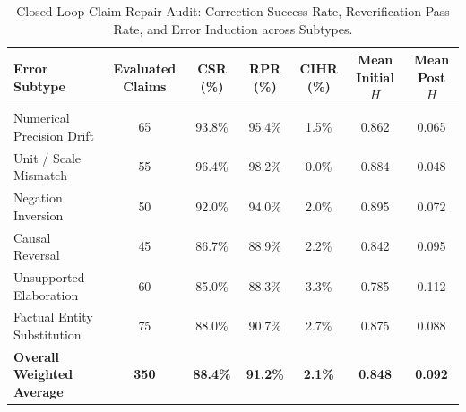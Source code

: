 \begin{table}[t]
\centering
\small
\caption{Closed-Loop Claim Repair Audit: Correction Success Rate, Reverification Pass Rate, and Error Induction across Subtypes.}
\label{tab:closed_loop_correction}
\begin{tabular}{lcccccc}
\toprule
\textbf{Error Subtype} & \textbf{Evaluated Claims} & \textbf{CSR (\%)} & \textbf{RPR (\%)} & \textbf{CIHR (\%)} & \textbf{Mean Initial $H$} & \textbf{Mean Post $H$} \\
\midrule
Numerical Precision Drift & 65 & 93.8\% & 95.4\% & 1.5\% & 0.862 & 0.065 \\
Unit / Scale Mismatch & 55 & 96.4\% & 98.2\% & 0.0\% & 0.884 & 0.048 \\
Negation Inversion & 50 & 92.0\% & 94.0\% & 2.0\% & 0.895 & 0.072 \\
Causal Reversal & 45 & 86.7\% & 88.9\% & 2.2\% & 0.842 & 0.095 \\
Unsupported Elaboration & 60 & 85.0\% & 88.3\% & 3.3\% & 0.785 & 0.112 \\
Factual Entity Substitution & 75 & 88.0\% & 90.7\% & 2.7\% & 0.875 & 0.088 \\
\midrule
\textbf{Overall Weighted Average} & \textbf{350} & \textbf{88.4\%} & \textbf{91.2\%} & \textbf{2.1\%} & \textbf{0.848} & \textbf{0.092} \\
\bottomrule
\end{tabular}
\end{table}
